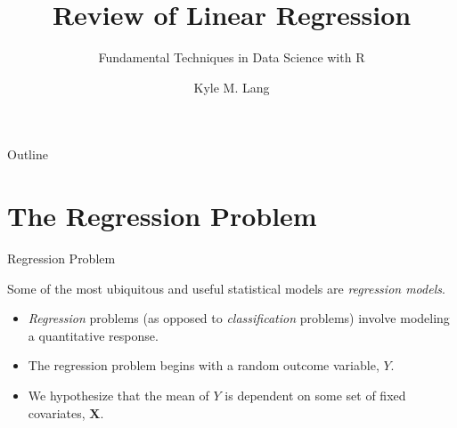 \documentclass[10pt]{beamer}\usepackage[]{graphicx}\usepackage[]{color}
\title{Review of Linear Regression}
\subtitle{Fundamental Techniques in Data Science with R}
\author{Kyle M. Lang}
\institute{Department of Methodology \& Statistics\\Utrecht University}
\date{}
\begin{document}

\begin{frame}[t,plain]
  \titlepage
\end{frame}


\begin{frame}{Outline}
  \tableofcontents
\end{frame}


\section{The Regression Problem}


\begin{frame}{Regression Problem}

  Some of the most ubiquitous and useful statistical models are \emph{regression
    models}.
  \vb
  \begin{itemize}
  \item \emph{Regression} problems (as opposed to \emph{classification}
    problems) involve modeling a quantitative response.
    \vb
  \item The regression problem begins with a random outcome variable, $Y$.
    \vb
  \item We hypothesize that the mean of $Y$ is dependent on some set of
    fixed covariates, $\mathbf{X}$.
  \end{itemize}

\end{frame}

\watermarkoff %
\end{document}
